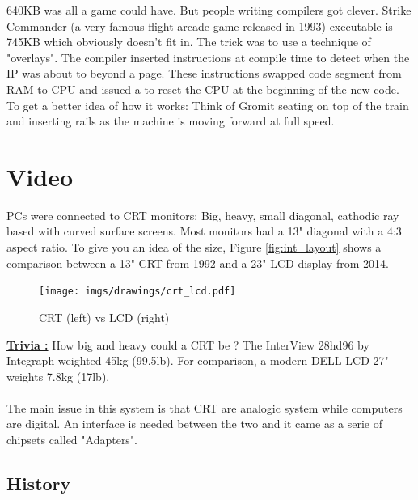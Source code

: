 \documentclass[book.tex]{subfiles}
\begin{document}
\par
{} 640KB was all a game could have. But people writing compilers got clever. Strike Commander (a very famous flight arcade game released in 1993) executable is 745KB which obviously doesn't fit in. The trick was to use a technique of "overlays". The compiler inserted instructions at compile time to detect when the IP was about to beyond a page. These instructions swapped code segment from RAM to CPU and issued a  to reset the CPU at the beginning of the new code. To get a better idea of how it works: Think of Gromit seating on top of the train and inserting rails as the machine is moving forward at full speed.

















\section{Video}

PCs were connected to CRT monitors: Big, heavy, small diagonal, cathodic ray based with curved surface screens. Most monitors had a 13" diagonal with a 4:3 aspect ratio. To give you an idea of the size, Figure \ref{fig:int_layout} shows a comparison between a 13" CRT from 1992 and a 23" LCD display from 2014.\\

\begin{figure}[H]
\centering
\texttt{[image: imgs/drawings/crt\_lcd.pdf]}
\caption{CRT (left) vs LCD (right)}
\label{fig:lcd_vs_crt}
\end{figure}

\textbf{\underline{Trivia :}} How big and heavy could a CRT be ? The InterView 28hd96 by Integraph weighted 45kg (99.5lb). For comparison, a modern DELL LCD 27" weights 7.8kg (17lb).\\
\\
The main issue in this system is that CRT are analogic system while computers are digital. An interface is needed between the two and it came as a serie of chipsets called "Adapters". 

  \subsection{History}
\end{document}

